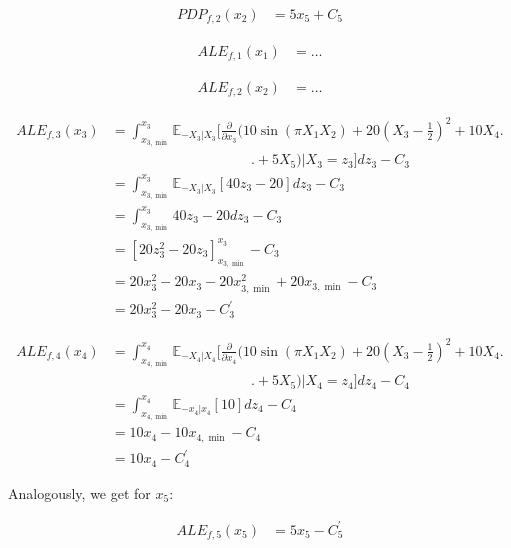\documentclass[runningheads]{llncs}
\begin{document}
\begin{align*}
    PDP_{f,2}(x_2) &= 5x_5 + C_5
\end{align*}

\begin{align*}
    ALE_{f,1}(x_1) &= \dots
\end{align*}

\begin{align*}
    ALE_{f,2}(x_2) &= \dots
\end{align*}

\begin{align*}
    ALE_{f,3}(x_3) &= \int_{x_{3,\min}}^{x_3} \mathbb{E}_{-X_3|X_3}\Bigg[\frac{\partial}{\partial x_3}(10\sin(\pi X_1X_2) + 20(X_3-\frac{1}{2})^2 + 10X_4 \Bigg. \\
    &\qquad\qquad\qquad\qquad\qquad \Bigg. + 5X_5) \big|X_3=z_3\Bigg]dz_3 - C_3 \\
    &= \int_{x_{3,\min}}^{x_3} \mathbb{E}_{-X_3|X_3}\left[40z_3-20\right]dz_3 - C_3 \\
    &= \int_{x_{3,\min}}^{x_3} 40z_3-20dz_3 - C_3 \\
    &= \left[20z_3^2 - 20z_3\right]_{x_{3,\min}}^{x_3} - C_3 \\
    &= 20x_3^2 - 20x_3 - 20x_{3,\min}^2 + 20x_{3,\min} - C_3 \\
    &= 20x_3^2 - 20x_3 - C_3^\prime
\end{align*}
    
\begin{align*}
    ALE_{f,4}(x_4) &= \int_{x_{4,\min}}^{x_4} \mathbb{E}_{-X_4|X_4}\Bigg[\frac{\partial}{\partial x_4}(10\sin(\pi X_1X_2) + 20(X_3-\frac{1}{2})^2 + 10X_4 \Bigg. \\
    &\qquad\qquad\qquad\qquad\qquad \Bigg. {} + 5X_5) \big|X_4=z_4\Bigg]dz_4 - C_4 \\
    &= \int_{x_{4,\min}}^{x_4} \mathbb{E}_{-x_4|x_4}\left[10\right]dz_4 - C_4 \\
    &= 10x_4 - 10x_{4,\min} - C_4 \\
    &= 10x_4 - C_4^\prime
\end{align*}

\noindent Analogously, we get for $x_5$:
    
\begin{align*}
    ALE_{f,5}(x_5) &= 5x_5 - C_5^\prime
\end{align*}
\end{document}
